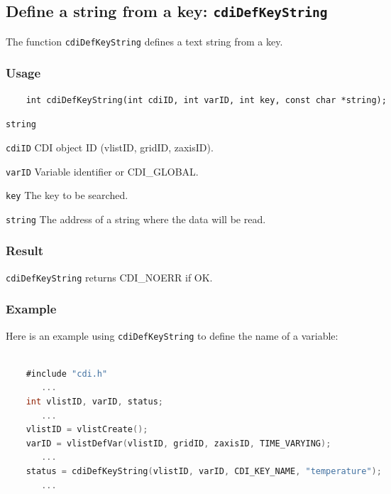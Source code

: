 

\subsection{Define a string from a key: \texttt{cdiDefKeyString}}
\label{cdiDefKeyString}

The function {\texttt{cdiDefKeyString}} defines a text string from a key.

\subsubsection*{Usage}

\begin{verbatim}
    int cdiDefKeyString(int cdiID, int varID, int key, const char *string);
\end{verbatim}

\hspace*{4mm}\begin{minipage}[]{15cm}
\begin{deflist}{\texttt{string}\ }
\item[\texttt{cdiID}]
CDI object ID (vlistID, gridID, zaxisID).
\item[\texttt{varID}]
Variable identifier or CDI\_GLOBAL.
\item[\texttt{key}]
The key to be searched.
\item[\texttt{string}]
The address of a string where the data will be read.

\end{deflist}
\end{minipage}

\subsubsection*{Result}

{\texttt{cdiDefKeyString}} returns CDI\_NOERR if OK.


\subsubsection*{Example}

Here is an example using {\texttt{cdiDefKeyString}} to define the name of a variable:

\begin{lstlisting}[language=C, backgroundcolor=\color{pyellow}, basicstyle=\small, columns=flexible]

    #include "cdi.h"
       ...
    int vlistID, varID, status;
       ...
    vlistID = vlistCreate();
    varID = vlistDefVar(vlistID, gridID, zaxisID, TIME_VARYING);
       ...
    status = cdiDefKeyString(vlistID, varID, CDI_KEY_NAME, "temperature");
       ...
\end{lstlisting}



